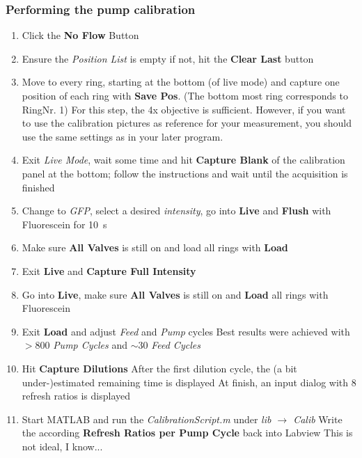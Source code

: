 \documentclass{article}
\newcounter{ListCounter}
\begin{document}
	\subsubsection{Performing the pump calibration}
	\begin{enumerate}
		\setcounter{enumi}{\value{ListCounter}}
	\item Click the \textbf{No Flow} Button
	\item Ensure the \textit{Position List} is empty
	\subitem if not, hit the \textbf{Clear Last} button
	\item Move to every ring, starting at the bottom (of live mode) and capture one position of each ring with \textbf{Save Pos}. (The bottom most ring corresponds to RingNr. 1)
	For this step, the 4x objective is sufficient. However, if you want to use the calibration pictures as reference for your measurement, you should use the same settings as in your later program.
	\item Exit \textit{Live Mode}, wait some time and hit \textbf{Capture Blank} of the calibration panel at the bottom; follow the instructions and wait until the acquisition is finished
	\item Change to \textit{GFP}, select a desired \textit{intensity}, go into \textbf{Live} and \textbf{Flush} with Fluorescein for \SI{10}{\second}
	\item Make sure \textbf{All Valves} is still on and load all rings with \textbf{Load}
	\item Exit \textbf{Live} and \textbf{Capture Full Intensity}
	\item Go into \textbf{Live}, make sure \textbf{All Valves} is still on and \textbf{Load} all rings with Fluorescein
	\item Exit \textbf{Load} and adjust \textit{Feed} and \textit{Pump} cycles
	\subitem Best results were achieved with $>$800 \textit{Pump Cycles} and $\sim$30 \textit{Feed Cycles}
	\item Hit \textbf{Capture Dilutions}
	\subitem After the first dilution cycle, the (a bit under-)estimated remaining time is displayed 
	\subitem At finish, an input dialog with 8 refresh ratios is displayed
	\item Start MATLAB and run the \textit{CalibrationScript.m} under \textit{lib $\rightarrow$ Calib}
	\subitem Write the according \textbf{Refresh Ratios per Pump Cycle} back into Labview
	\subitem This is not ideal, I know...	\setcounter{ListCounter}{\value{enumi}}
\end{enumerate}
\end{document}
